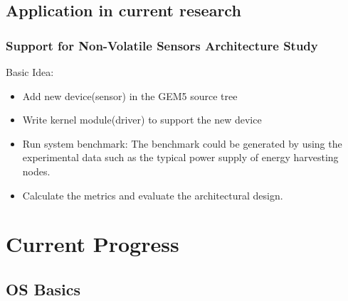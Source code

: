 \documentclass{beamer}
\begin{document}
\subsection{Application in current research}
\begin{frame}
\frametitle{Support for Non-Volatile Sensors Architecture Study}
Basic Idea:
\begin{itemize}
    \item Add new device(sensor) in the GEM5 source tree
    \item Write kernel module(driver) to support the new device
    \item Run system benchmark: The benchmark could be generated by using the
	experimental data such as the typical power supply of energy harvesting nodes.
    \item Calculate the metrics and evaluate the architectural design.
\end{itemize}
\end{frame}
\section{Current Progress}
\subsection{OS Basics}
\end{document}
